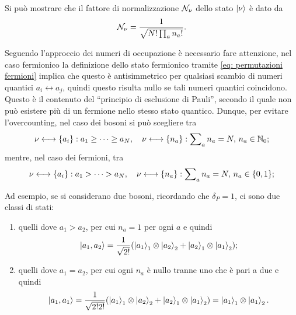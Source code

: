 \begin{obs}
    Si può mostrare che il fattore di normalizzazione $\mathcal{N}_\nu$ dello stato $\ket{\nu}$ è dato da
    \begin{equation}
    \label{eq: normalizzazione microstati sistemi non interagenti identici}
        \mathcal{N}_\nu = \frac{1}{\sqrt{N!\prod\nolimits_an_a!}}.
    \end{equation}
\end{obs}
Seguendo l'approccio dei numeri di occupazione è necessario fare attenzione, nel caso fermionico la definizione dello stato fermionico tramite \eqref{eq: permutazioni fermioni} implica che questo è antisimmetrico per qualsiasi scambio di numeri quantici $a_i \leftrightarrow a_j$, quindi questo risulta nullo se tali numeri quantici coincidono. Questo è il contenuto del ``principio di esclusione di Pauli'', secondo il quale non può esistere più di un fermione nello stesso stato quantico. Dunque, per evitare l'overcounting, nel caso dei bosoni si può scegliere tra
\begin{equation}
    \nu \longleftrightarrow \{a_i\} : a_1 \ge \cdots \ge a_N,\quad \nu \longleftrightarrow \{n_a\} : \sum\nolimits_an_a = N,\, n_a \in \mathbb{N}_0;
\end{equation}
mentre, nel caso dei fermioni, tra
\begin{equation}
    \nu \longleftrightarrow \{a_i\} : a_1 > \cdots > a_N,\quad \nu \longleftrightarrow \{n_a\} : \sum\nolimits_an_a = N,\, n_a \in \{0,1\};
\end{equation}
\begin{ex}
    Ad esempio, se si considerano due bosoni, ricordando che $\delta_P = 1$, ci sono due classi di stati:
    \begin{enumerate}
        \item quelli dove $a_1 > a_2$, per cui $n_a = 1$  per ogni $a$ e quindi
        \begin{equation}
            \ket{a_1,a_2} = \frac{1}{\sqrt{2!}}(\ket{a_1}_1 \otimes \ket{a_2}_2 + \ket{a_2}_1 \otimes \ket{a_1}_2);
        \end{equation}
        \item quelli dove $a_1 = a_2$, per cui ogni $n_a$ è nullo tranne uno che è pari a due e quindi
        \begin{equation}
            \ket{a_1,a_1} = \frac{1}{\sqrt{2!2!}}(\ket{a_1}_1 \otimes \ket{a_2}_2 + \ket{a_2}_1 \otimes \ket{a_1}_2) = \ket{a_1}_1 \otimes \ket{a_1}_2.
        \end{equation}
    \end{enumerate}
\end{ex}

